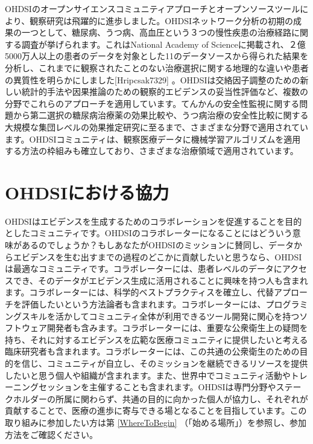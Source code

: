 \documentclass[
  11pt]{book}
\theoremstyle{definition}
\theoremstyle{definition}
\theoremstyle{definition}
\theoremstyle{definition}
\theoremstyle{remark}
\begin{document}
OHDSIのオープンサイエンスコミュニティアプローチとオープンソースツールにより、観察研究は飛躍的に進歩しました。OHDSIネットワーク分析の初期の成果の一つとして、糖尿病、うつ病、高血圧という３つの慢性疾患の治療経路に関する調査が挙げられます。これはNational Academy of Scienceに掲載され、２億5000万人以上の患者のデータを対象とした11のデータソースから得られた結果を分析し、これまでに観察されたことのない治療選択に関する地理的な違いや患者の異質性を明らかにしました{[}Hripcsak7329{]} 。OHDSIは交絡因子調整のための新しい統計的手法\citep{tian_2018}や因果推論のための観察的エビデンスの妥当性評価\citep{schuemie_2018}など、複数の分野でこれらのアプローチを適用しています。てんかんの安全性監視に関する問題\citep{duke_2017}から第二選択の糖尿病治療薬の効果比較\citep{vashisht_2018}や、うつ病治療の安全性比較に関する大規模な集団レベルの効果推定研究\citep{schuemie_2018b}に至るまで、さまざまな分野で適用されています。OHDSIコミュニティは、観察医療データに機械学習アルゴリズムを適用する方法の枠組みも確立しており\citep{reps2018}、さまざまな治療領域で適用されています。\citep{johnston_2019, cepeda_2018, reps_2019}

\section{OHDSIにおける協力}\label{ohdsiux306bux304aux3051ux308bux5354ux529b}

OHDSIはエビデンスを生成するためのコラボレーションを促進することを目的としたコミュニティです。OHDSIのコラボレーターになることにはどういう意味があるのでしょうか？もしあなたがOHDSIのミッションに賛同し、データからエビデンスを生む出すまでの過程のどこかに貢献したいと思うなら、OHDSIは最適なコミュニティです。コラボレーターには、患者レベルのデータにアクセスでき、そのデータがエビデンス生成に活用されることに興味を持つ人も含まれます。コラボレーターには、科学的ベストプラクティスを確立し、代替アプローチを評価したいという方法論者も含まれます。コラボレーターには、プログラミングスキルを活かしてコミュニティ全体が利用できるツール開発に関心を持つソフトウェア開発者も含みます。コラボレーターには、重要な公衆衛生上の疑問を持ち、それに対するエビデンスを広範な医療コミュニティに提供したいと考える臨床研究者も含まれます。コラボレーターには、この共通の公衆衛生のための目的を信じ、コミュニティが自立し、そのミッションを継続できるリソースを提供したいと思う個人や組織が含まれます。また、世界中でコミュニティ活動やトレーニングセッションを主催することも含まれます。OHDSIは専門分野やステークホルダーの所属に関わらず、共通の目的に向かった個人が協力し、それぞれが貢献することで、医療の進歩に寄与できる場となることを目指しています。この取り組みに参加したい方は第 \ref{WhereToBegin} （「始める場所」）を参照し、参加方法をご確認ください。
\end{document}
